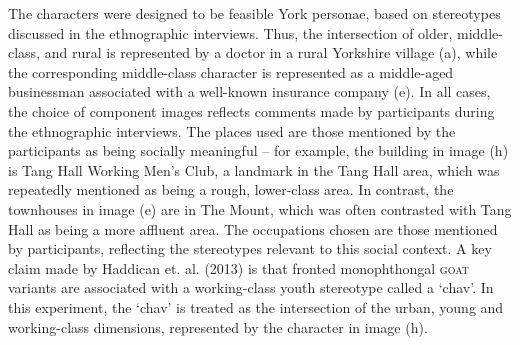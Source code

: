 \documentclass[PWPL]{article}
\begin{document}
\begin{figure}[H]
{    \label{fig:subfig6}
}
\end{figure}
The characters were designed to be feasible York personae, based on stereotypes discussed in the ethnographic interviews. Thus, the intersection of older, middle-class, and rural is represented by a doctor in a rural Yorkshire village (a), while the corresponding middle-class character is represented as a middle-aged businessman associated with a well-known insurance company (e). In all cases, the choice of component images reflects comments made by participants during the ethnographic interviews. The places used are those mentioned by the participants as being socially meaningful -- for example, the building in image (h) is Tang Hall Working Men's Club, a landmark in the Tang Hall area, which was repeatedly mentioned as being a rough, lower-class area. In contrast, the townhouses in image (e) are in The Mount, which was often contrasted with Tang Hall as being a more affluent area. The occupations chosen are those mentioned by participants, reflecting the stereotypes relevant to this social context. A key claim made by Haddican et. al. (2013) is that fronted monophthongal \textsc{goat} variants are associated with a working-class youth stereotype called a `chav'. In this experiment, the `chav' is treated as the intersection of the urban, young and working-class dimensions, represented by the character in image (h).
\end{document}
